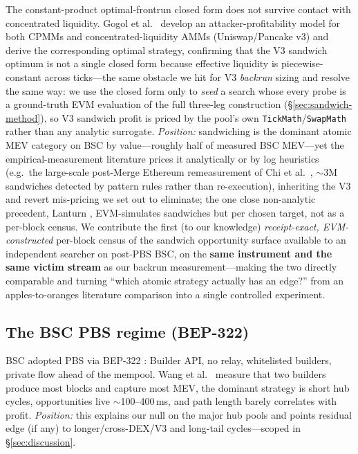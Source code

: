 \documentclass[11pt]{article}
\newcommand{\code}[1]{\texttt{#1}}
\begin{document}
The constant-product optimal-frontrun closed form does not survive contact with
concentrated liquidity. Gogol et al.\ \cite{gogol2026sandwich} develop an
attacker-profitability model for both CPMMs and concentrated-liquidity AMMs
(Uniswap/Pancake v3) and derive the corresponding optimal strategy, confirming that
the V3 sandwich optimum is not a single closed form because effective liquidity is
piecewise-constant across ticks---the same obstacle we hit for V3 \emph{backrun}
sizing and resolve the same way: we use the closed form only to \emph{seed} a search
whose every probe is a ground-truth EVM evaluation of the full three-leg
construction (\S\ref{sec:sandwich-method}), so V3 sandwich profit is priced by the
pool's own \code{TickMath}/\code{SwapMath} rather than any analytic surrogate.
\emph{Position:} sandwiching is the dominant atomic MEV category on BSC by
value---roughly half of measured BSC MEV---yet the empirical-measurement literature
prices it analytically or by log heuristics (e.g.\ the large-scale post-Merge
Ethereum remeasurement of Chi et al.\ \cite{chi2024remeasuring}, $\sim$3M sandwiches
detected by pattern rules rather than re-execution), inheriting the V3 and revert
mis-pricing we set out to eliminate; the one close non-analytic precedent, Lanturn
\cite{babel2023lanturn}, EVM-simulates sandwiches but per chosen target, not as a
per-block census. We contribute the first (to our knowledge) \emph{receipt-exact,
EVM-constructed} per-block census of the sandwich opportunity surface available to an
independent searcher on post-PBS BSC, on the \textbf{same instrument and the same
victim stream} as our backrun measurement---making the two directly comparable and
turning ``which atomic strategy actually has an edge?'' from an apples-to-oranges
literature comparison into a single controlled experiment.

\subsection{The BSC PBS regime (BEP-322)}
BSC adopted PBS via BEP-322 \cite{bep322}: Builder API, no relay, whitelisted
builders, private flow ahead of the mempool. Wang et al.\ \cite{wang2025binance}
measure that two builders produce most blocks and capture most MEV, the dominant
strategy is short hub cycles, opportunities live $\sim$100--400\,ms, and path length
barely correlates with profit. \emph{Position:} this explains our null on the major
hub pools and points residual edge (if any) to longer/cross-DEX/V3 and long-tail
cycles---scoped in \S\ref{sec:discussion}.
\end{document}
